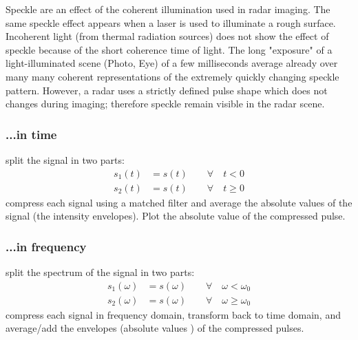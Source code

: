 Speckle are an effect of the coherent illumination used in radar imaging. The same speckle effect appears when a laser is used to illuminate a rough surface. Incoherent light (from thermal radiation sources) does not show the effect of speckle because of the short coherence time of light. The long "{}exposure"{} of a light-illuminated scene (Photo, Eye) of a few milliseconds average already over many many coherent representations of the extremely quickly changing speckle pattern. However, a radar uses a strictly defined pulse shape which does not changes during imaging; therefore speckle remain visible in the radar scene. 

\subsubsection{...in time}
split the signal in two parts:
\begin{align}
s_1(t) &= s(t) \qquad \forall  \quad t < 0\\
s_2(t) &= s(t) \qquad \forall  \quad t  \geq 0
\end{align}
compress each signal using a matched filter and average the absolute values of the signal (the intensity envelopes). Plot the absolute value of the compressed pulse.
\subsubsection{...in frequency}
split the spectrum of the signal in two parts:
\begin{align}
s_1(\omega) &= s(\omega) \qquad \forall \quad \omega < \omega_0\\
s_2(\omega) &= s(\omega) \qquad \forall  \quad \omega \geq \omega_0
\end{align}
compress each signal in frequency domain, transform back to time domain, and average/add the envelopes (absolute values ) of the compressed pulses.\\


